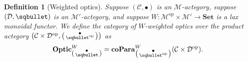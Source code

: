 \documentclass[11pt,a4paper,openright,twoside]{report}
\newcounter{mycounter}
\theoremstyle{plain}
\newtheorem{definition}[mycounter]{Definition}
\theoremstyle{definition}
\begin{document}
\begin{definition}[Weighted optics]
  Suppose $(\mathcal{C}, \bullet)$ is an $\mathcal{M}$-actegory, suppose $(\mathcal{D}, \sqbullet)$ is an $\mathcal{M}'$-actegory, and suppose $W: \mathcal{M}^{\mathrm{op}} \times \mathcal{M}' \to \mathbf{Set}$ is a lax monoidal functor.
  We define the category of $W$-weighted optics over the product actegory $\left(\mathcal{C}\times\mathcal{D}^{\mathrm{op}},\left(\begin{smallmatrix}\bullet\\\sqbullet^{\mathrm{op}}\end{smallmatrix}\right)\right)$ as
  \[\mathbf{Optic}^W_{\left(\begin{smallmatrix}\bullet\\\sqbullet\end{smallmatrix}\right)} = \mathbf{coPara}^W_{\left(\begin{smallmatrix}\bullet\\\sqbullet^{\mathrm{op}}\end{smallmatrix}\right)}(\mathcal{C}\times\mathcal{D}^{\mathrm{op}}).\]
\end{definition}
\end{document}
